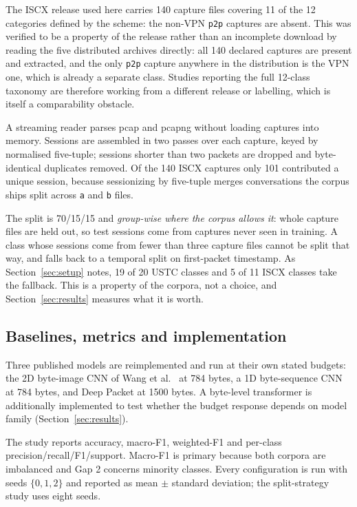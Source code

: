 \documentclass[pdflatex,sn-mathphys-num]{sn-jnl}
\theoremstyle{thmstyleone}%
\theoremstyle{thmstylethree}%
\begin{document}
The ISCX release used here carries 140 capture files covering 11 of the 12
categories defined by the scheme: the non-VPN \texttt{p2p} captures are absent.
This was verified to be a property of the release rather than an incomplete
download by reading the five distributed archives directly: all 140 declared
captures are present and extracted, and the only \texttt{p2p} capture anywhere
in the distribution is the VPN one, which is already a separate class.
Studies reporting the full 12-class taxonomy are therefore working from a
different release or labelling, which is itself a comparability obstacle.


A streaming reader parses pcap and pcapng without loading captures into
memory. Sessions are assembled in two passes over each capture, keyed by
normalised five-tuple; sessions shorter than two packets are dropped and
byte-identical duplicates removed. Of the 140 ISCX captures only 101
contributed a unique session, because sessionizing by five-tuple merges
conversations the corpus ships split across \texttt{a} and \texttt{b} files.

The split is 70/15/15 and \emph{group-wise where the corpus allows it}: whole
capture files are held out, so test sessions come from captures never seen in
training. A class whose sessions come from fewer than three capture files
cannot be split that way, and falls back to a temporal split on first-packet
timestamp. As Section~\ref{sec:setup} notes, 19 of 20 USTC classes and 5 of 11
ISCX classes take the fallback. This is a property of the corpora, not a
choice, and Section~\ref{sec:results} measures what it is worth.

\subsection{Baselines, metrics and implementation}

Three published models are reimplemented and run at their own stated budgets:
the 2D byte-image CNN of Wang et al.~\cite{ustc} at 784 bytes, a 1D
byte-sequence CNN at 784 bytes, and Deep Packet at 1500 bytes. A byte-level
transformer is additionally implemented to test whether the budget response
depends on model family (Section~\ref{sec:results}).

The study reports accuracy, macro-F1, weighted-F1 and per-class
precision/recall/F1/support. Macro-F1 is primary because both corpora are
imbalanced and Gap 2 concerns minority classes. Every configuration is run with
seeds $\{0,1,2\}$ and reported as mean $\pm$ standard deviation; the
split-strategy study uses eight seeds.
\end{document}
